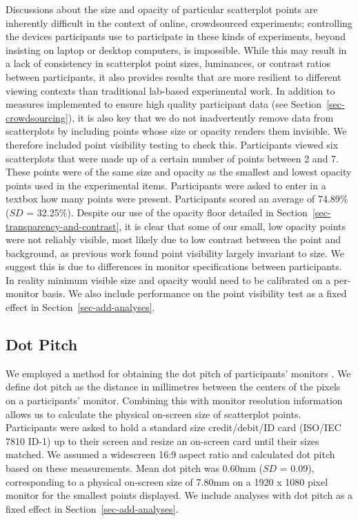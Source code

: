 \documentclass[manuscript, review, anonymous, screen]{acmart}
\begin{document}
Discussions about the size and opacity of particular scatterplot points
are inherently difficult in the context of online, crowdsourced
experiments; controlling the devices participants use to participate in
these kinds of experiments, beyond insisting on laptop or desktop
computers, is impossible. While this may result in a lack of consistency
in scatterplot point sizes, luminances, or contrast ratios between
participants, it also provides results that are more resilient to
different viewing contexts than traditional lab-based experimental work.
In addition to measures implemented to ensure high quality participant
data (see Section~\ref{sec-crowdsourcing}), it is also key that we do
not inadvertently remove data from scatterplots by including points
whose size or opacity renders them invisible. We therefore included
point visibility testing to check this. Participants viewed six
scatterplots that were made up of a certain number of points between 2
and 7. These points were of the same size and opacity as the smallest
and lowest opacity points used in the experimental items. Participants
were asked to enter in a textbox how many points were present.
Participants scored an average of 74.89\% (\(SD\) = 32.25\%). Despite
our use of the opacity floor detailed in
Section~\ref{sec-transparency-and-contrast}, it is clear that some of
our small, low opacity points were not reliably visible, most likely due
to low contrast between the point and background, as previous work
\citep{strain_2023b} found point visibility largely invariant to size.
We suggest this is due to differences in monitor specifications between
participants. In reality minimum visible size and opacity would need to
be calibrated on a per-monitor basis. We also include performance on the
point visibility test as a fixed effect in
Section~\ref{sec-add-analyses}.

\hypertarget{sec-dot-pitch}{%
\subsection{Dot Pitch}\label{sec-dot-pitch}}

We employed a method for obtaining the dot pitch of participants'
monitors \citep{screenscale}. We define dot pitch as the distance in
millimetres between the centers of the pixels on a participants'
monitor. Combining this with monitor resolution information allows us to
calculate the physical on-screen size of scatterplot points.
Participants were asked to hold a standard size credit/debit/ID card
(ISO/IEC 7810 ID-1) up to their screen and resize an on-screen card
until their sizes matched. We assumed a widescreen 16:9 aspect ratio and
calculated dot pitch based on these measurements. Mean dot pitch was
0.60mm (\(SD\) = 0.09), corresponding to a physical on-screen size of
7.80mm on a 1920 x 1080 pixel monitor for the smallest points displayed.
We include analyses with dot pitch as a fixed effect in
Section~\ref{sec-add-analyses}.
\end{document}
